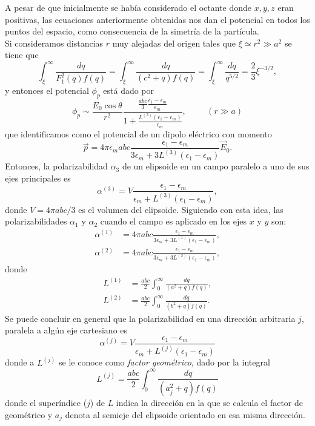 A pesar de que inicialmente se había considerado el octante donde $x,y,z$ eran positivas, las ecuaciones anteriormente obtenidas nos dan el potencial en todos los puntos del espacio, como consecuencia de la simetría de la partícula.\\

Si consideramos distancias $r$ muy alejadas del origen tales que $\xi\simeq r^2\gg a^2$ se tiene que
\begin{equation*}
    \int_{\xi}^{\infty}\frac{dq}{F_1^2(q)f(q)}= \int_{\xi}^{\infty}\frac{dq}{(c^2+q)f(q)}=\int_{\xi}^{\infty}\frac{dq}{q^{5/2}}=\frac{2}{3}\xi^{-3/2},
\end{equation*}
y entonces el potencial $\phi_p$ está dado por
\begin{equation}
    \phi_p\sim\frac{E_0\cos\theta}{r^2}\frac{\frac{abc}{3}\frac{\epsilon_1-\epsilon_m}{\epsilon_m}}{1+\frac{L^{(3)}(\epsilon_1-\epsilon_m)}{\epsilon_m}},\hspace{1cm}(r\gg a)
\end{equation}
que identificamos como el potencial de un dipolo eléctrico con momento 
\begin{equation}
    \Vec{p}=4\pi\epsilon_m abc\frac{\epsilon_1-\epsilon_m}{3\epsilon_m+3L^{(3)}(\epsilon_1-\epsilon_m)}\Vec{E}_0
    \label{momento_dip}.
\end{equation}
Entonces, la polarizabilidad $\alpha_3$ de un elipsoide en un campo paralelo a uno de sus ejes principales es
\begin{equation}
    \alpha^{(3)}=V\frac{\epsilon_1-\epsilon_m}{\epsilon_m+L^{(3)}(\epsilon_1-\epsilon_m)},
\end{equation}
donde $V=4\pi abc/3$ es el volumen del elipsoide. Siguiendo con esta idea, las polarizabilidades $\alpha_1$ y $\alpha_2$ cuando el campo es aplicado en los ejes $x$ y $y$ son:
\begin{align}
    \alpha^{(1)}&=4\pi abc \frac{\epsilon_1-\epsilon_m}{3\epsilon_m+3L^{(1)}(\epsilon_1-\epsilon_m)},\\
    \alpha^{(2)}&=4\pi abc \frac{\epsilon_1-\epsilon_m}{3\epsilon_m+3L^{(2)}(\epsilon_1-\epsilon_m)},
\end{align}
donde 
\begin{align}
    L^{(1)}&=\frac{abc}{2}\int_{0}^{\infty}\frac{dq}{(a^2+q)f(q)},\\
    L^{(2)}&=\frac{abc}{2}\int_{0}^{\infty}\frac{dq}{(b^2+q)f(q)}.
\end{align}
Se puede concluir en general que la polarizabilidad en una dirección arbitraria $j$, paralela a algún eje cartesiano es
\begin{equation}
    \alpha^{(j)}=V\frac{\epsilon_1-\epsilon_m}{\epsilon_m+L^{(j)}(\epsilon_1-\epsilon_m)}
\end{equation}
donde a $L^{(j)}$ se le conoce como \textit{factor geométrico}, dado por la integral 
\begin{equation}
    L^{(j)}=\frac{abc}{2}\int_0^{\infty}\frac{dq}{(a_j^2+q)f(q)}
\end{equation}
donde el superíndice ($j$) de $L$ indica la dirección en la que se calcula el factor de geométrico y $a_j$ denota al semieje del elipsoide orientado en esa misma dirección. 

